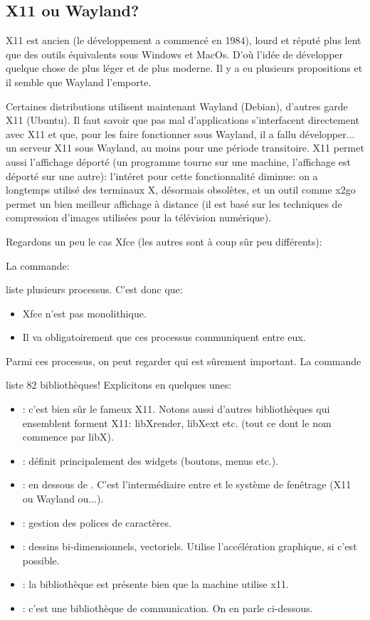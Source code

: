 \subsection{X11 ou Wayland?}
X11 est ancien (le développement a commencé en 1984), lourd et réputé
plus lent que des outils équivalents sous Windows et MacOs. D'où
l'idée de développer quelque chose de plus léger et de plus
moderne. Il y a eu plusieurs propositions et il semble que Wayland
l'emporte.

Certaines distributions utilisent maintenant Wayland (Debian),
d'autres garde X11 (Ubuntu). Il faut savoir que pas mal d'applications
s'interfacent directement avec X11 et que, pour les faire fonctionner
sous Wayland, il a fallu développer... un serveur X11 sous Wayland, au
moins pour une période transitoire.
 X11 permet aussi l'affichage déporté (un programme tourne sur une
 machine, l'affichage est déporté sur une autre): l'intéret pour cette
 fonctionnalité diminue: on a longtemps utilisé des terminaux X,
 désormais obsolètes, et un outil comme x2go permet un bien meilleur
 affichage à distance (il est basé sur les techniques de compression
 d'images utilisées pour la télévision numérique).

 Regardons un peu le cas Xfce (les autres sont à coup sûr peu
 différents):

 La commande:


 liste plusieurs processus. C'est donc que:
 \begin{itemize}
 \item Xfce n'est pas monolithique.
 \item Il va obligatoirement que ces processus communiquent entre eux.
 \end{itemize}


 Parmi ces processus, on peut regarder 
  qui est sûrement important. La commande


 liste 82 bibliothèques! Explicitons en quelques unes:

 \begin{itemize}
 \item {}: c'est bien sûr le fameux X11. Notons aussi
   d'autres bibliothèques qui ensemblent forment X11: libXrender,
   libXext etc. (tout ce dont le nom commence par libX).
 \item {}: définit principalement des \og widgets\fg{}
   (boutons, menus etc.).
 \item {}: \og en dessous \fg{} de . C'est
   l'intermédiaire entre  et le système de fenêtrage (X11 ou
   Wayland ou...).
 \item {}: gestion des polices de caractères.
 \item {}: dessins bi-dimensionnels, vectoriels. Utilise
   l'accélération graphique, si c'est possible.
 \item {}: la bibliothèque est présente bien que la
   machine utilise x11.
 \item {}: c'est une bibliothèque de communication. On en
   parle ci-dessous.
 \end{itemize}

